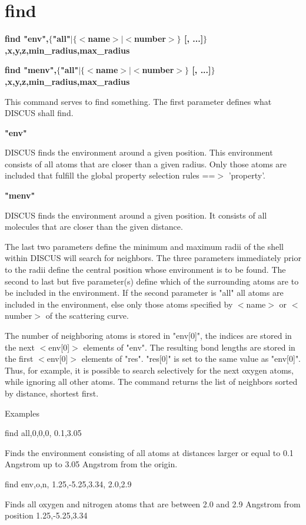 \section{find}
{\bf find "env",$ \{$"all"$| $$ \{$$ <$name$> $$| $$ <$number$> $$\} $ [, ...]$\} $,x,y,z,min\_radius,max\_radius \par }
{\bf find "menv",$ \{$"all"$| $$ \{$$ <$name$> $$| $$ <$number$> $$\} $ [, ...]$\} $,x,y,z,min\_radius,max\_radius \par }
\par
\vspace{3pt}
This command serves to find something. The first parameter defines 
what DISCUS shall find. 
\par
{\bf "env" \par }
\vspace{3pt}
DISCUS finds the environment around a given position. This environment 
consists of all atoms that are closer than a given radius. 
Only those atoms are included that fulfill the global property 
selection rules ==$> $ 'property'. 
\par
{\bf "menv" \par }
\vspace{3pt}
DISCUS finds the environment around a given position. It consists 
of all molecules that are closer than the given distance. 
\par
The last two parameters define the minimum and maximum radii of the 
shell within DISCUS will search for neighbors. 
The three parameters immediately prior to the radii define the 
central position whose environment is to be found. 
The second to last but five parameter(s) define which of the 
surrounding atoms are to be included in the environment. If the 
second parameter is "all" all atoms are included in the environment, 
else only those atoms specified by $ <$name$> $ or $ <$number$> $ of the 
scattering curve. 
\par
The number of neighboring atoms is stored in "env[0]", the indices 
are stored in the next $ <$env[0]$> $ elements of "env". The resulting bond 
lengths are stored in the first $ <$env[0]$> $ elements of "res". "res[0]" 
is set to the same value as "env[0]". Thus, for example, it is possible 
to search selectively for the next oxygen atoms, while ignoring all 
other atoms. 
The command returns the list of neighbors sorted by distance, 
shortest first. 
\par
Examples 
\par
\begin{MacVerbatim}
find all,0,0,0, 0.1,3.05
\end{MacVerbatim}
Finds the environment consisting of all atoms at distances larger 
or equal to 0.1 Angstrom up to 3.05 Angstrom from the origin. 
\par
\begin{MacVerbatim}
find env,o,n, 1.25,-5.25,3.34, 2.0,2.9
\end{MacVerbatim}
Finds all oxygen and nitrogen atoms that are between 2.0 
and 2.9 Angstrom from position 1.25,-5.25,3.34 
